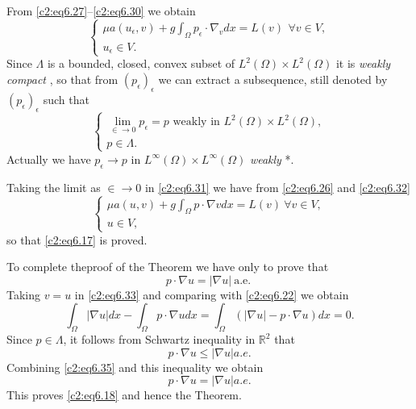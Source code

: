 From \eqref{c2:eq6.27}--\eqref{c2:eq6.30} we obtain
\begin{equation}
\begin{cases}
\mu a (u_\epsilon , v) + g \int_\Omega p_\epsilon \cdot
\nabla_v dx= L (v) ~\, \forall  v \in V,\\ 
u_\epsilon \in V . 
\end{cases}
\tag{6.31}\label{c2:eq6.31}
\end{equation}
Since $\Lambda$ is a bounded, closed, convex subset of $L^2 (\Omega)
\times L^2 (\Omega)$ it is \textit{ weakly compact }, so that from
$(p_\epsilon )_\epsilon $ we can extract a subsequence, still
denoted by $(p_\epsilon )_\epsilon $ such that  
\begin{equation}
\begin{cases}
\lim_{ \in \to 0} p_\epsilon = p \text{ weakly  in } L^2
(\Omega) \times L^2 (\Omega), \\ 
p \in \Lambda .
\end{cases}
\tag{6.32}\label{c2:eq6.32}
\end{equation}
Actually we have $p_\epsilon \to p$ in $L^\infty  (\Omega ) \times
L^\infty (\Omega )$ \textit{ weakly } *. 

Taking the limit as $\in \to 0$ in \eqref{c2:eq6.31} we have from
\eqref{c2:eq6.26} and \eqref{c2:eq6.32} 
\begin{equation}
\begin{cases}
\mu a(u, v) + g \int_\Omega p \cdot \nabla v dx = L (v) ~
\forall v \in V,\\ 
u \in V,
\end{cases}
\tag{6.33}\label{c2:eq6.33}
\end{equation}
so that \eqref{c2:eq6.17} is proved.

To complete the\pageoriginale  proof of the Theorem we have only to prove that 
\begin{equation}
p \cdot \nabla u = |\nabla u|
~\text{a.e.}~ \tag{6.34}\label{c2:eq6.34}  
\end{equation}
Taking $v = u$ in \eqref{c2:eq6.33} and comparing with
\eqref{c2:eq6.22} we obtain  
\begin{equation}
\int_\Omega |\nabla u| dx - \int_\Omega p \cdot \nabla u
dx = \int_\Omega (|\nabla u|- p \cdot \nabla u) dx =
0. \tag{6.35}\label{c2:eq6.35}  
\end{equation}
Since $p \in \Lambda$, it follows from Schwartz inequality in
$\mathbb{R}^2$ that  
$$
p \cdot \nabla u \leq |\nabla u| a. e.
$$
Combining \eqref{c2:eq6.35} and this inequality we obtain
$$
p \cdot \nabla u = |\nabla u| a. e.
$$
This proves \eqref{c2:eq6.18} and hence the Theorem. 

